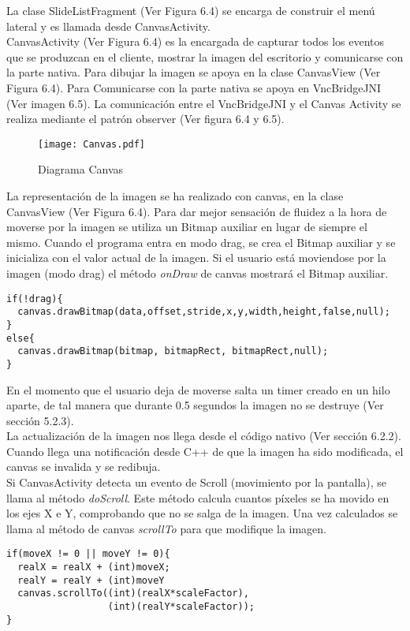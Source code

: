La clase SlideListFragment (Ver Figura 6.4) se encarga de construir el menú lateral y es llamada desde CanvasActivity.\\

CanvasActivity (Ver Figura 6.4) es la encargada de capturar todos los eventos que se produzcan en el cliente, mostrar la imagen del escritorio y comunicarse con la parte nativa. Para dibujar la imagen se apoya en la clase CanvasView (Ver Figura 6.4). Para Comunicarse con la parte nativa se apoya en VncBridgeJNI (Ver imagen 6.5). La comunicación entre el VncBridgeJNI y el Canvas Activity se realiza mediante el patrón observer (Ver figura 6.4 y 6.5).\\

\begin{figure}[h]
\begin{center}
\texttt{[image: Canvas.pdf]}
\end{center}
\caption{Diagrama Canvas}
\end{figure}

La representación de la imagen se ha realizado con canvas, en la clase CanvasView (Ver Figura 6.4). Para dar mejor sensación de fluidez a la hora de moverse por la imagen se utiliza un Bitmap auxiliar en lugar de siempre el mismo. Cuando el programa entra en modo drag, se crea el Bitmap auxiliar y se inicializa con el valor actual de la imagen. Si el usuario está moviendose por la imagen (modo drag) el método \emph{onDraw} de canvas mostrará el Bitmap auxiliar.
\begin{lstlisting}
if(!drag){	
  canvas.drawBitmap(data,offset,stride,x,y,width,height,false,null);
}
else{
  canvas.drawBitmap(bitmap, bitmapRect, bitmapRect,null);
}
\end{lstlisting}
\newpage
En el momento que el usuario deja de moverse salta un timer creado en un hilo aparte, de tal manera que durante 0.5 segundos la imagen no se destruye (Ver sección 5.2.3).\\

La actualización de la imagen nos llega desde el código nativo (Ver sección 6.2.2). Cuando llega una notificación desde C++ de que la imagen ha sido modificada, el canvas se invalida y se redibuja.\\

Si CanvasActivity detecta un evento de Scroll (movimiento por la pantalla), se llama al método \emph{doScroll}. Este método calcula cuantos píxeles se ha movido en los ejes X e Y, comprobando que no se salga de la imagen. Una vez calculados se llama al método de canvas \emph{scrollTo} para que modifique la imagen.
\begin{lstlisting}
if(moveX != 0 || moveY != 0){
  realX = realX + (int)moveX;
  realY = realY + (int)moveY
  canvas.scrollTo((int)(realX*scaleFactor),
		          (int)(realY*scaleFactor));
}
\end{lstlisting}


